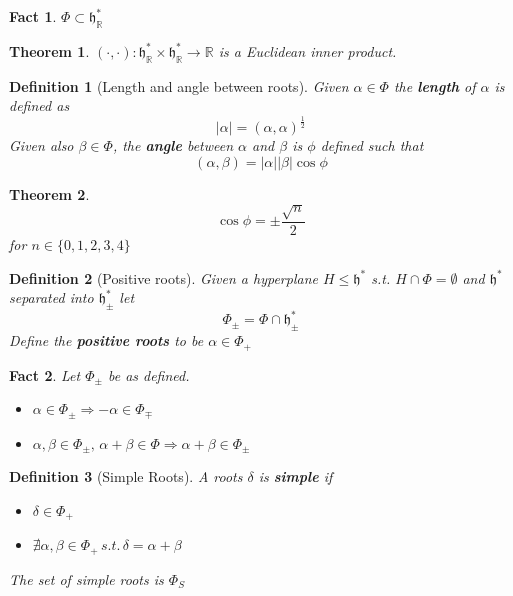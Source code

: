 \documentclass{article}
\newtheorem{theorem}{Theorem}[subsection]
\newtheorem{definition}{Definition}[subsection]
\newtheorem{fact}{Fact}[subsection]
\newcommand{\bam}[1]{\textbf{#1}}
\newcommand{\mf}[1]{\mathfrak{#1}}
\newcommand{\mbb}[1]{\mathbb{#1}}
\newcommand{\set}[1]{\lbrace #1 \rbrace}
\begin{document}
\begin{fact}
$\Phi\subset\mf{h}^\ast_\mbb{R}$
\end{fact}

\begin{theorem}
$(\cdot,\cdot) : \mf{h}^\ast_\mbb{R} \times \mf{h}^\ast_\mbb{R} \to \mbb{R}$ is a Euclidean inner product. 
\end{theorem}

\begin{definition}[Length and angle between roots]
Given $\alpha\in\Phi$ the \bam{length} of $\alpha$ is defined as 
\[
|\alpha|=(\alpha,\alpha)^\frac{1}{2}
\]
Given also $\beta\in\Phi$, the \bam{angle} between $\alpha$ and $\beta$ is $\phi$ defined such that 
\[
(\alpha, \beta) = |\alpha||\beta|\cos{\phi}
\]
\end{definition}

\begin{theorem}
\[
\cos\phi=\pm\frac{\sqrt{n}}{2}
\]
for $n\in\set{  0,1,2,3,4  }$
\end{theorem}

\begin{definition}[Positive roots]
Given a hyperplane $H\leq\mf{h}^\ast$ s.t. $H\cap\Phi=\emptyset$ and $\mf{h}^\ast$ separated into $\mf{h}^\ast_\pm$ let 
\[
\Phi_\pm=\Phi\cap\mf{h}^\ast_\pm
\]
Define the \bam{positive roots} to be $\alpha\in\Phi_+$
\end{definition}

\begin{fact} Let $\Phi_\pm$ be as defined.
\begin{itemize}
    \item $\alpha\in\Phi_\pm \Rightarrow -\alpha\in\Phi_\mp$
    \item $\alpha,\beta\in\Phi_\pm,\, \alpha+\beta\in\Phi \Rightarrow \alpha+\beta\in\Phi_\pm$
\end{itemize}
\end{fact}

\begin{definition}[Simple Roots]
A roots $\delta$ is \bam{simple} if 
\begin{itemize}
\item $\delta\in\Phi_+$
\item $\nexists \alpha,\beta\in\Phi_+ \, s.t. \, \delta=\alpha+\beta$
\end{itemize}
The set of simple roots is $\Phi_S$
\end{definition}
\end{document}
